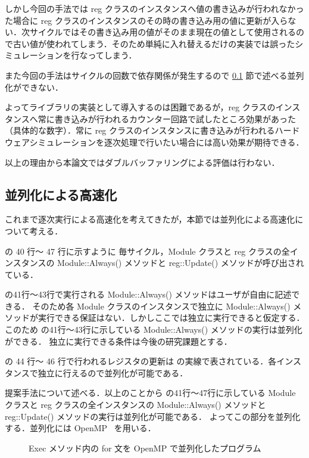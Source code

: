 しかし今回の手法では reg
クラスのインスタンスへ値の書き込みが行われなかった場合に reg
クラスのインスタンスのその時の書き込み用の値に更新が入らない．次サイクルではその書き込み用の値がそのまま現在の値として使用されるので古い値が使われてしまう．そのため単純に入れ替えるだけの実装では誤ったシミュレーションを行なってしまう．

また今回の手法はサイクルの回数で依存関係が発生するので \ref{ss:parallel}
節で述べる並列化ができない．

よってライブラリの実装として導入するのは困難であるが，reg
クラスのインスタンスへ常に書き込みが行われるカウンター回路で試したところ効果があった（具体的な数字）．常に
reg
クラスのインスタンスに書き込みが行われるハードウェアシミュレーションを逐次処理で行いたい場合には高い効果が期待できる．

以上の理由から本論文ではダブルバッファリングによる評価は行わない．

\fi

\subsection{並列化による高速化} \label{ss:parallel}

これまで逐次実行による高速化を考えてきたが，本節では並列化による高速化について考える．

 の 40 行〜 47 行に示すように
毎サイクル，Module クラスと reg クラスの全インスタンスの Module::Always() メソッドと reg::Update() メソッドが呼び出されている．

 の41行〜43行で実行される Module::Always() メソッドはユーザが自由に記述できる．
そのため各 Module クラスのインスタンスで独立に Module::Always() メソッドが実行できる保証はない．しかしここでは独立に実行できると仮定する．
このため の41行〜43行に示している Module::Always() メソッドの実行は並列化ができる．
独立に実行できる条件は今後の研究課題とする．

 の 44 行〜 46 行で行われるレジスタの更新は の実線で表されている．各インスタンスで独立に行えるので並列化が可能である．

提案手法について述べる．以上のことから の41行〜47行に示している
Module クラスと reg クラスの全インスタンスの Module::Always() メソッドと reg::Update() メソッドの実行は並列化が可能である．
よってこの部分を並列化する．並列化には OpenMP~\cite{openmp} を用いる．

\begin{figure}[t]
 
 \caption{Exec メソッド内の for 文を OpenMP で並列化したプログラム}
 \label{src:exec_openmp}
\end{figure}

